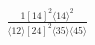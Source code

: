 \documentclass[varwidth, border=5pt]{standalone}
\begin{document}
\begin{my}
$\begin{gathered}
\scriptscriptstyle\frac{1[14]^2⟨14⟩^2}{⟨12⟩[24]^2⟨35⟩⟨45⟩}
\end{gathered}$
\end{my}
\end{document}
